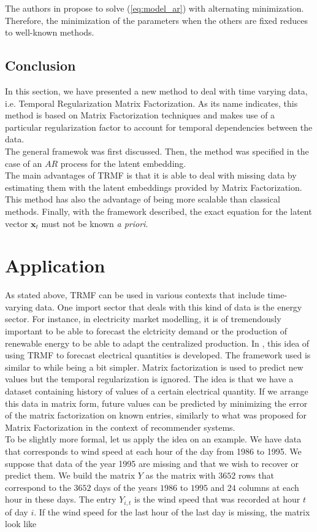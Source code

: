 \documentclass{article}
\begin{document}
The authors in \cite{TRMF} propose to solve (\ref{eq:model_ar}) with alternating minimization. Therefore, the minimization of the parameters when the others are fixed reduces to well-known methods.

\subsection*{Conclusion}
In this section, we have presented a new method to deal with time varying data, i.e. Temporal Regularization Matrix Factorization. As its name indicates, this method is based on Matrix Factorization techniques and makes use of a particular regularization factor to account for temporal dependencies between the data. \\
The general framewok was first discussed. Then, the method was specified in the case of an $AR$ process for the latent embedding. \\
The main advantages of TRMF is that it is able to deal with missing data by estimating them with the latent embeddings provided by Matrix Factorization. This method has also the advantage of being more scalable than classical methods. Finally, with the framework described, the exact equation for the latent vector $\mathbf{x}_t$ must not be known \emph{a priori}.

\section{Application}
As stated above, TRMF can be used in various contexts that include time-varying data. One import sector that deals with this kind of data is the energy sector.
For instance, in electricity market modelling, it is of tremendously important to be able to forecast the elctricity demand or the production of renewable energy to be able to adapt the centralized production.
In \cite{Elec}, this idea of using TRMF to forecast electrical quantities is developed.
The framework used is similar to \cite{TRMF} while being a bit simpler. Matrix factorization is used to predict new values but the temporal regularization is ignored. The idea is that we have a dataset containing history of values of a certain electrical quantity. If we arrange this data in matrix form, future values can be predicted by minimizing the error of the matrix factorization on known entries, similarly to what was proposed for Matrix Factorization in the context of recommender systems. \\
To be slightly more formal, let us apply the idea on an example. We have data that corresponds to wind speed at each hour of the day from 1986 to 1995. We suppose that data of the year 1995 are missing and that we wish to recover or predict them. We build the matrix $Y$ as the matrix with $3652$ rows that correspond to the $3652$ days of the years $1986$ to $1995$ and $24$ columns at each hour in these days. The entry $Y_{i,t}$ is the wind speed that was recorded at hour $t$ of day $i$. If the wind speed for the last hour of the last day is missing, the matrix look like
\end{document}
